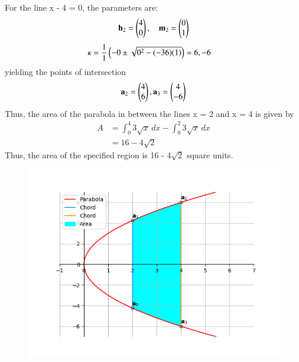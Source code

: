 \documentclass[journal]{IEEEtran}
\begin{document}
For the line x - 4 = 0, the parameters are:
\begin{align}
\mathbf{h}_2 = \begin{pmatrix}4 \\ 0\end{pmatrix}, \quad \mathbf{m}_2 = \begin{pmatrix}0 \\ 1\end{pmatrix}
\end{align}
\begin{align}
\kappa &= \frac{1}{1}\left(-0 \pm \sqrt{0^2 - (-36)(1)}\right) = 6,-6
\end{align}
yielding the points of intersection
\begin{align}
\mathbf{a}_2 = \begin{pmatrix}4 \\ 6\end{pmatrix},\mathbf{a}_3 = \begin{pmatrix}4 \\ -6\end{pmatrix}
\end{align}
Thus, the area of the parabola in between the lines x = 2 and
x = 4 is given by
\begin{align}
A &= \int_{0}^{4} 3\sqrt{x} \, dx -\int_{0}^{2} 3\sqrt{x}\,dx  \\
&= 16 - 4\sqrt{2}
\end{align}
Thus, the area of the specified region is 16 - 4$\sqrt{2}$ square units.
    \begin{figure}[H]
    \centering
    \includegraphics[width=0.7\columnwidth]{figs/Figure_1.png}
    \label{fig:placeholder}
    \caption{}
\end{figure}
\end{document}
